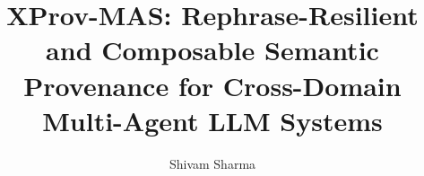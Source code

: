 \documentclass[graybox]{svmult}
\begin{document}
\newcommand{\PubHealthEvidenceDensePairFOneDelta}{-0.522 [-0.600, -0.438]}
\newcommand{\PubHealthEvidenceXProvPairFOneDelta}{-0.391 [-0.480, -0.293]}
\newcommand{\PubHealthEvidenceDenseRephraseDelta}{0.084 [0.039, 0.136]}
\newcommand{\PubHealthEvidenceXProvRephraseDelta}{0.084 [0.041, 0.135]}
\newcommand{\PubHealthEvidenceDenseComposableDelta}{0.122 [0.036, 0.228]}
\newcommand{\PubHealthEvidenceXProvComposableDelta}{0.122 [0.030, 0.229]}
\newcommand{\PAWSTrainLexAUC}{0.496}
\newcommand{\PAWSTrainDenseAUC}{0.634}
\newcommand{\PAWSTrainHybridAUC}{0.554}
\newcommand{\PAWSValidationLexAUC}{0.501}
\newcommand{\PAWSValidationDenseAUC}{0.631}
\newcommand{\PAWSValidationHybridAUC}{0.555}
\newcommand{\PAWSTestLexAUC}{0.495}
\newcommand{\PAWSTestDenseAUC}{0.631}
\newcommand{\PAWSTestHybridAUC}{0.555}
\newcommand{\SciFactSensitivityBest}{0.754}
\newcommand{\SciFactSensitivityPrimary}{0.552}
\newcommand{\SciFactTrainBest}{0.734}
\newcommand{\SciFactTrainBestDense}{0.55}
\newcommand{\SciFactTrainBestHybrid}{0.70}
\newcommand{\FEVERAssertions}{299970}
\newcommand{\SciFactAssertions}{4500}
\newcommand{\PubHealthAssertions}{18315}
\newcommand{\EvidenceAssertions}{495}

\title*{XProv-MAS: Rephrase-Resilient and Composable Semantic Provenance for Cross-Domain Multi-Agent LLM Systems}
\author{Shivam Sharma}
\maketitle
\end{document}
